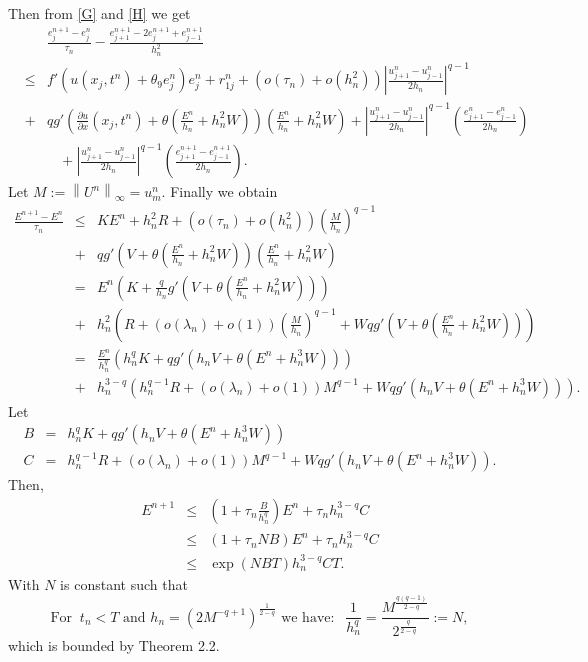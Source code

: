 \documentclass[a4paper,12pt,english,reqno]{smfart}
\begin{document}
	Then from \eqref{G} and \eqref{H} we get
	\begin{eqnarray*}
		&&\frac{e_{j}^{n+1}-e_{j}^{n}}{\tau_{n}}-\frac{e_{j+1}^{n+1}-2e_{j}^{n+1}+e_{j-1}^{n+1}}{h_{n}^{2}}\\
		&\leq&f'(u(x_{j},t^{n})+\theta_{9}e_{j}^{n})e_{j}^{n}+r_{1j}^{n}+\left(o(\tau_{n})+o(h_{n}^{2})\right)\left|\frac{u_{j+1}^{n}-u_{j-1}^{n}}{2h_{n}}\right|^{q-1}\\
		&+&qg'\left(\frac{\partial u}{\partial x}(x_{j},t^{n})+\theta\left(\frac{E^{n}}{h_{n}}+h_{n}^{2}W\right)\right)\left(\frac{E^{n}}{h_{n}}+h_{n}^{2}W\right)+\left|\frac{u_{j+1}^{n}-u_{j-1}^{n}}{2h_{n}}\right|^{q-1}\left(\frac{e_{j+1}^{n}-e_{j-1}^{n}}{2h_{n}}\right)\\
		&&\ \ \  \ +\left|\frac{u_{j+1}^{n}-u_{j-1}^{n}}{2h_{n}}\right|^{q-1}\left(\frac{e_{j+1}^{n+1}-e_{j-1}^{n+1}}{2h_{n}}\right).
	\end{eqnarray*}
	Let $M:=\left\|U^{n}\right\|_{\infty}=u_{m}^{n}.$
	Finally we obtain
	\begin{eqnarray*}
		\frac{E^{n+1}-E^{n}}{\tau_{n}}&\leq& KE^{n}+h_{n}^{2}R+\left(o(\tau_{n})+o(h_{n}^{2})\right)\left(\frac{M}{h_{n}}\right)^{q-1}\\
		&+&qg'\left(V+\theta\left(\frac{E^{n}}{h_{n}}+h_{n}^{2}W\right)\right)\left(\frac{E^{n}}{h_{n}}+h_{n}^{2}W\right)\\
		&=&E^{n}\left(K+\frac{q}{h_{n}}g'\left(V+\theta\left(\frac{E^{n}}{h_{n}}+h_{n}^{2}W\right)\right)\right)\\
		&+&h_{n}^{2}\left(R+\left(o(\lambda_{n})+o(1)\right)\left(\frac{M}{h_{n}}\right)^{q-1}+Wqg'\left(V+\theta\left(\frac{E^{n}}{h_{n}}+h_{n}^{2}W\right)\right)\right)\\
		&=&\frac{E^{n}}{h_{n}^{q}}\left(h_{n}^{q}K+qg'\left(h_{n}V+\theta\left(E^{n}+h_{n}^{3}W\right)\right)\right)\\
		&+&h_{n}^{3-q}\left(h_{n}^{q-1}R+\left(o(\lambda_{n})+o(1)\right)M^{q-1}+Wqg'\left(h_{n}V+\theta\left(E^{n}+h_{n}^{3}W\right)\right)\right).
	\end{eqnarray*}
	Let 
	\begin{eqnarray*}
		B&=&h_{n}^{q}K+qg'\left(h_{n}V+\theta\left(E^{n}+h_{n}^{3}W\right)\right)\\
		C&=&h_{n}^{q-1}R+\left(o(\lambda_{n})+o(1)\right)M^{q-1}+Wqg'\left(h_{n}V+\theta\left(E^{n}+h_{n}^{3}W\right)\right).
	\end{eqnarray*}
	Then,
	\begin{eqnarray*}
		E^{n+1}&\leq&\left(1+\tau_{n}\frac{B}{h_{n}^{q}}\right)E^{n}+\tau_{n}h_{n}^{3-q}C\\
		&\leq&\left(1+\tau_{n}NB\right)E^{n}+\tau_{n}h_{n}^{3-q}C\\
		&\leq&\exp(NBT)h_{n}^{3-q}CT.
	\end{eqnarray*}
	With $N$ is constant such that
	\begin{equation*}
	\text{For } \  t_{n}<T \text{  and } h_{n}=\left(2M^{-q+1}\right)^{\frac{1}{2-q}} \text{  we have: } \ \ \dfrac{1}{h_{n}^{q}}=\dfrac{M^{\frac{q(q-1)}{2-q}}}{2^{\frac{q}{2-q}}}:=N,
	\end{equation*}
	which is bounded by Theorem 2.2.
	
\end{document}
